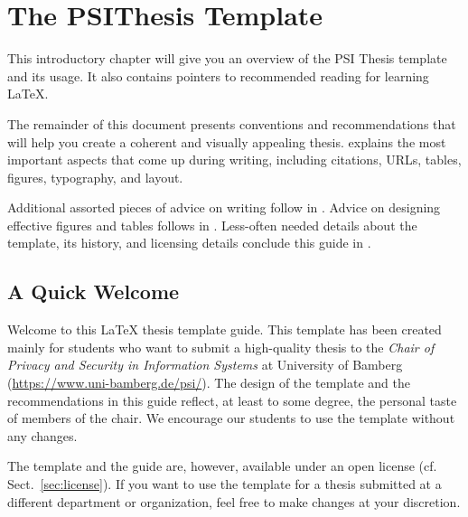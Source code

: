 \chapter{The PSIThesis Template} %

\label{Chapter1} %


This introductory chapter will give you an overview of the PSI Thesis template and its usage.
It also contains pointers to recommended reading for learning \LaTeX{}.

The remainder of this document presents conventions and recommendations that will help you create a coherent and visually appealing thesis.  explains the most important aspects that come up during writing, including citations, URLs, tables, figures, typography, and layout.

Additional assorted pieces of advice on writing follow in . Advice on designing effective figures and tables follows in . Less-often needed details about the template, its history, and licensing details conclude this guide in .

\section{A Quick Welcome}

Welcome to this LaTeX thesis template guide.%
This template has been created mainly for students who want to submit a high-quality thesis to the \emph{Chair of Privacy and Security in Information Systems} at University of Bamberg (\url{https://www.uni-bamberg.de/psi/}).
The design of the template and the recommendations in this guide reflect, at least to some degree, the personal taste of members of the chair.
We encourage our students to use the template without any changes.

The template and the guide are, however, available under an open license (cf. Sect.~\ref{sec:license}). If you want to use the template for a thesis submitted at a different department or organization, feel free to make changes at your discretion.

